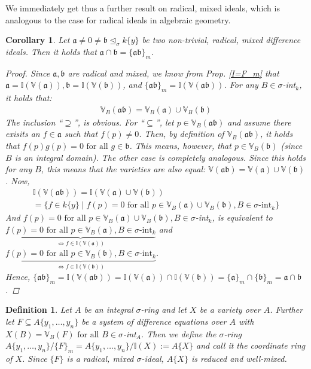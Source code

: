 \documentclass{article}
\def\I{\mathbb{I}}
\def\VV{\mathbb{V}}
\def\a{\mathfrak{a}}
\def\b{\mathfrak{b}}
\def\s{\sigma}
\def\si{\unlhd_{\sigma}}
\def\fa{\text{ for all }}
\newenvironment{bew}{\begin{proof}[Proof]}{\end{proof}}
\theoremstyle{plain}
\newtheorem{cor}[Satz]{Corollary}
\newtheorem{defn}[Satz]{Definition}
\theoremstyle{definition}
\begin{document}
We immediately get thus a further result on radical, mixed ideals, which is analogous to the case for radical ideals in algebraic geometry.
\begin{cor}\label{prod=cap}
Let $\a \neq 0 \neq \b \si k\{y\}$ be two non-trivial, radical, mixed difference ideals. Then it holds that $\a \cap \b = \{ \a \b \}_m$.
\begin{bew}
Since $\a, \b$ are radical and mixed, we know from Prop. \ref{I=F_m} that $\a = \I(\VV(\a)), \b = \I(\VV(\b))$, and $\{ \a \b \}_m = \I( \VV( \a \b ))$.
For any $B \in \s$-int$_k$, it holds that:
\begin{align*} \VV_B( \a \b) = \VV_B( \a) \cup \VV_B( \b) \end{align*}
The inclusion ``$\supseteq$'', is obvious. For ``$\subseteq$'', let $p \in \VV_B(\a\b)$ and assume there exisits an $f \in \a$ such that $f(p) \neq 0$.
Then, by definition of $\VV_B(\a\b)$, it holds that $f(p)g(p) = 0 \fa g \in \b$. This means, however, that $p \in \VV_B(\b)$ (since $B$ is an integral domain). The other case is completely analogous.
Since this holds for any $B$, this means that the varieties are also equal: $\VV( \a \b) = \VV( \a) \cup \VV( \b)$. Now,
\begin{align*} \I(\VV(\a \b)) = \I(\VV(\a) \cup \VV(\b)) \\ = \{ f \in k\{y\} \mid f(p) = 0 \fa p \in \VV_B(\a) \cup \VV_B(\b), B \in \s\text{-int}_k \} \end{align*}
And $f(p) = 0 \fa p \in \VV_B(\a) \cup \VV_B(\b), B \in \s$-int$_k$, is equivalent to \\
$ \underbrace{f(p) = 0 \fa p \in \VV_B(\a), B \in \s\text{-int}_k}_{\Leftrightarrow f \in \I(\VV(\a))}$ and $ \underbrace{f(p) = 0 \fa p \in \VV_B(\b), B \in \s\text{-int}_k}_{\Leftrightarrow f \in \I(\VV(\b))}$. \\
Hence, $\{\a\b\}_m = \I(\VV( \a \b)) = \I(\VV(\a)) \cap \I(\VV(\b)) = \{\a\}_m \cap \{\b\}_m = \a \cap \b$.
\end{bew}
\end{cor}

\begin{defn}
Let $A$ be an integral $\s$-ring and let $X$ be a variety over $A$. Further let $F \subseteq A\{y_1, \ldots, y_n\}$ be a system of difference equations over $A$ with $X(B) = \VV_B(F) \fa B \in \s$-int$_A$.
Then we define the $\s$-ring $A\{y_1, \ldots, y_n\}/\{F\}_m = A\{y_1, \ldots, y_n\}/\I(X) := A\{X\}$ and call it the coordinate ring of $X$. Since $\{F\}$ is a radical, mixed $\s$-ideal, $A\{X\}$ is reduced and well-mixed.
\end{defn}
\end{document}
